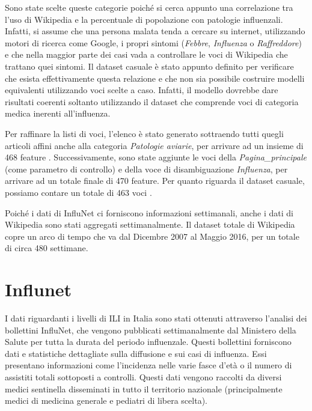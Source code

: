 Sono state scelte queste categorie poiché si cerca appunto una correlazione tra l'uso di Wikipedia e la percentuale di 
popolazione con patologie influenzali. Infatti, si assume che una persona malata tenda a cercare su internet, utilizzando 
motori di ricerca come Google, i propri sintomi (\textit{Febbre}, \textit{Influenza} o \textit{Raffreddore}) e che nella 
maggior parte dei casi vada a controllare le voci di Wikipedia che trattano quei sintomi. Il dataset casuale è stato appunto 
definito per verificare che esista effettivamente questa relazione e che non sia possibile costruire modelli equivalenti 
utilizzando voci scelte a caso. Infatti, il modello dovrebbe dare risultati coerenti soltanto utilizzando il dataset che 
comprende voci di categoria medica inerenti all'influenza. 
\bigskip 

Per raffinare la listi di voci, l'elenco è stato generato sottraendo tutti quegli articoli affini anche alla categoria 
\textit{Patologie aviarie}, per arrivare ad un insieme di 468 feature \cite{PetScanQuery}. Successivamente, sono state 
aggiunte le voci della \textit{Pagina_principale} (come parametro di controllo) e della voce di disambiguazione 
\textit{Influenza}, per arrivare ad un totale finale di 470 feature. Per quanto riguarda il dataset casuale, possiamo contare 
un totale di 463 voci \cite{PetScanRandom}.
\bigskip

Poiché i dati di InfluNet ci forniscono informazioni settimanali, anche i dati di Wikipedia sono stati aggregati 
settimanalmente. Il dataset totale di Wikipedia copre un arco di tempo che va dal Dicembre 2007 al Maggio 2016, per un totale 
di circa 480 settimane.

\section{Influnet}
\bigskip 

I dati riguardanti i livelli di ILI in Italia sono stati ottenuti attraverso l'analisi dei bollettini InfluNet,
che vengono pubblicati settimanalmente dal Ministero della Salute per tutta la durata del periodo influenzale.
Questi bollettini forniscono dati e statistiche dettagliate sulla diffusione e sui casi di influenza. Essi presentano 
informazioni come l'incidenza nelle varie fasce d'età o il numero di assistiti totali sottoposti a controlli. 
Questi dati vengono raccolti da diversi medici sentinella disseminati in tutto il territorio nazionale (principalmente medici di medicina generale e pediatri di libera scelta).
\bigskip

